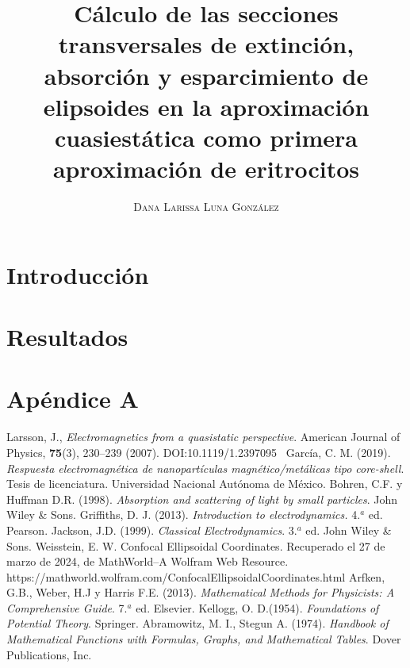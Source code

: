 \documentclass[paper=letter,8.5pt]{article}
\title{\vspace{-15mm}\fontsize{17pt}\selectfont\textbf{Cálculo de las secciones transversales de extinción, absorción y esparcimiento de elipsoides en la aproximación cuasiestática como primera aproximación de eritrocitos }} %
\author{
\large
{\textsc{ Dana Larissa Luna González}}\\[2mm]}
\date{}
\begin{document}
\maketitle %
\thispagestyle{fancy} %
\section{Introducción}




\section{Resultados}

\section{Apéndice A}

















\begin{thebibliography}{99}
 Larsson, J., \textit{Electromagnetics from a quasistatic perspective}. American Journal of Physics, \textbf{75}(3), 230–239 (2007). DOI:10.1119/1.2397095 
 García, C. M. (2019). \textit{Respuesta electromagnética de nanopartículas magnético/metálicas tipo core-shell}. Tesis de licenciatura. Universidad Nacional Autónoma de México.
Bohren, C.F. y  Huffman D.R.  (1998). \textit{Absorption and scattering of light by small particles}. John Wiley \& Sons.
Griffiths, D. J.  (2013). \textit{Introduction to electrodynamics.} 4.$^a$ ed. Pearson.
Jackson, J.D.  (1999). \textit{Classical Electrodynamics}. 3.$^a$ ed.  John Wiley \& Sons.
 Weisstein, E. W. Confocal Ellipsoidal Coordinates. Recuperado el 27 de marzo de 2024, de MathWorld--A Wolfram Web Resource. https://mathworld.wolfram.com/ConfocalEllipsoidalCoordinates.html
 Arfken, G.B., Weber, H.J y Harris F.E. (2013). \textit{Mathematical Methods for Physicists: A Comprehensive Guide}. 7.$^a$ ed. Elsevier.
 Kellogg, O. D.(1954). \textit{Foundations of Potential Theory}. Springer.
 Abramowitz, M. I., Stegun A. (1974). \textit{Handbook of Mathematical Functions with Formulas, Graphs, and
Mathematical Tables}. Dover Publications, Inc.
\end{thebibliography}

\end{document}
